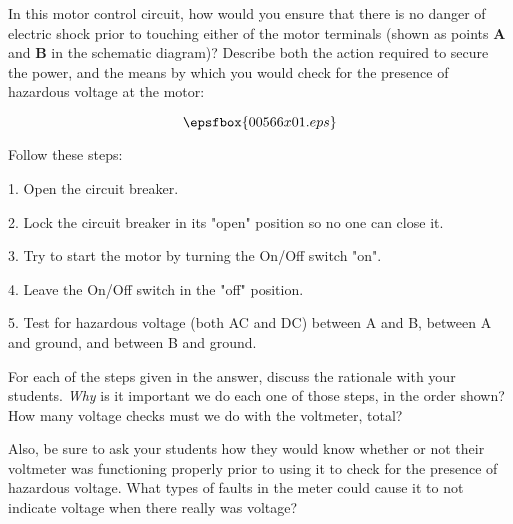 

In this motor control circuit, how would you ensure that there is no danger of electric shock prior to touching either of the motor terminals (shown as points {\bf A} and {\bf B} in the schematic diagram)?  Describe both the action required to secure the power, and the means by which you would check for the presence of hazardous voltage at the motor:

$$\epsfbox{00566x01.eps}$$







Follow these steps:

\medskip
\item{1.} Open the circuit breaker.
\item{2.} Lock the circuit breaker in its "open" position so no one can close it.
\item{3.} Try to start the motor by turning the On/Off switch "on".
\item{4.} Leave the On/Off switch in the "off" position.
\item{5.} Test for hazardous voltage (both AC and DC) between A and B, between A and ground, and between B and ground.
\medskip







For each of the steps given in the answer, discuss the rationale with your students.  {\it Why} is it important we do each one of those steps, in the order shown?  How many voltage checks must we do with the voltmeter, total?  

Also, be sure to ask your students how they would know whether or not their voltmeter was functioning properly prior to using it to check for the presence of hazardous voltage.  What types of faults in the meter could cause it to not indicate voltage when there really was voltage?




